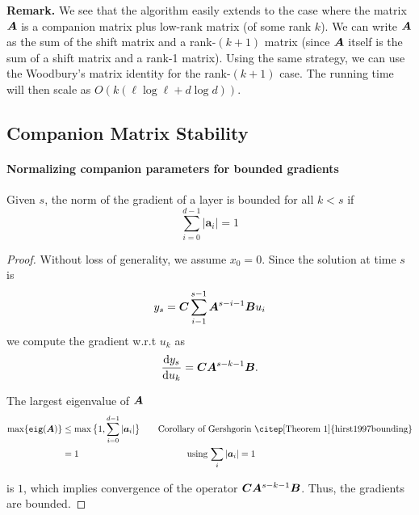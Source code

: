 \textbf{Remark.} We see that the algorithm easily extends to the case where the matrix $\boldsymbol{A}$ is a companion matrix plus low-rank matrix (of some rank $k$).
We can write $\boldsymbol{A}$ as the sum of the shift matrix and a rank-$(k+1)$ matrix (since $\boldsymbol{A}$ itself is the sum of a shift matrix and a rank-1 matrix).
Using the same strategy, we can use the Woodbury's matrix identity for the rank-$(k+1)$ case.
The running time will then scale as $O(k (\ell \log \ell + d \log d))$.


\subsection{Companion Matrix Stability}

\paragraph{Normalizing companion parameters for bounded gradients}
%
\begin{prop}
%
Given $s$, the norm of the gradient of a \ourmethod{} layer is bounded for all $k < s$ if 
\[\sum_{i=0}^{d-1} |\boldsymbol{a}_i| = 1
\]
%
\end{prop}

\begin{proof}
Without loss of generality, we assume $x_0 = 0$. Since the solution at time $s$ is 
\[
y_s = \boldsymbol{C} \sum_{i-1}^{s-1} \boldsymbol{A}^{s-i-1} \boldsymbol{B} u_i 
\]
we compute the gradient w.r.t $u_k$ as
\begin{equation}
    \begin{aligned}
    \frac{\dd y_s}{\dd u_k} = \boldsymbol{C} \boldsymbol{A}^{s-k-1} \boldsymbol{B}. 
    \end{aligned}
\end{equation}

%

The largest eigenvalue of $\boldsymbol{A}$
\[
\begin{aligned}
    \max\{{\tt eig}(\zA)\} 
    &\leq \max\big\{1, \sum_{i=0}^{d-1}  |\boldsymbol{a}_i|\big\}\quad\quad \text{Corollary of Gershgorin \citep[Theorem 1]{hirst1997bounding}} \\
&= 1 ~~~~~~~~~~~~~~~~~~~~~~~~~~~~~~~~~~~~ \text{using $\sum_i|\boldsymbol{a}_i| = 1$}
\end{aligned}
\]

is $1$, which implies convergence of the operator $\boldsymbol{C} \boldsymbol{A}^{s-k-1} \boldsymbol{B}$. Thus, the gradients are bounded. 

\end{proof}

